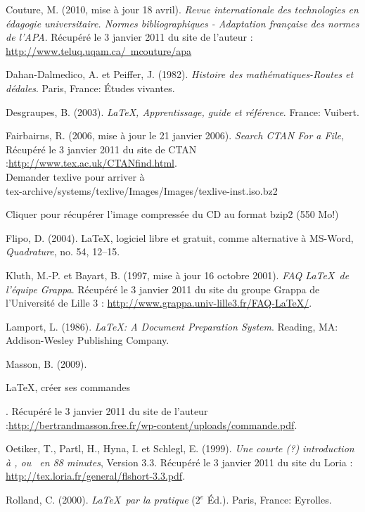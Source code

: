 \bigskip


\begin{thebibliography}{10}

 Couture, M. (2010, mise à jour 18 avril). {\em Revue internationale des technologies en édagogie universitaire. Normes bibliographiques - Adaptation française des normes de l'APA}. Récupéré le 3 janvier 2011 du site de l'auteur :  \href {http://www.teluq.uqam.ca/~mcouture/apa}{http://www.teluq.uqam.ca/~mcouture/apa}

 Dahan-Dalmedico, A.  et Peiffer, J. (1982). {\em Histoire des mathématiques-Routes et dédales}. Paris, France: Études vivantes.

 Desgraupes, B. (2003). {\em \LaTeX, Apprentissage, guide et référence}. France: Vuibert.

 Fairbairns, R. (2006, mise à jour le 21 janvier 2006). {\em Search CTAN For a File}, Récupéré le 3 janvier 2011 du site de CTAN :\href{http://www.tex.ac.uk/CTANfind.html}{http://www.tex.ac.uk/CTANfind.html}.\\
Demander texlive pour arriver à \\tex-archive/systems/texlive/Images/Images/texlive-inst.iso.bz2

Cliquer pour récupérer l'image compressée du CD au format bzip2 (550 Mo!)

 Flipo, D. (2004).  \LaTeX, logiciel libre et gratuit, comme alternative à MS-Word, {\em Quadrature}, no. 54, 12--15.

  Kluth, M.-P. et Bayart, B. (1997, mise à jour 16 octobre 2001). {\em FAQ  \LaTeX~de l'équipe Grappa}. Récupéré le 3 janvier 2011 du site du groupe Grappa de l'Université de Lille 3 : \href{http://www.grappa.univ-lille3.fr/FAQ-LaTeX/}{http://www.grappa.univ-lille3.fr/FAQ-LaTeX/}.

 Lamport, L. (1986). {\em \LaTeX: A Document Preparation System}. Reading, MA: Addison-Wesley Publishing Company.

 Masson, B. (2009). \begin{itshape}{\LaTeX, créer ses commandes}\end{itshape}. Récupéré le 3 janvier 2011 du site de l'auteur :\href {http://bertrandmasson.free.fr/wp-content/uploads/commande.pdf}{http://bertrandmasson.free.fr/wp-content/uploads/commande.pdf}.

 Oetiker, T., Partl, H., Hyna, I. et Schlegl, E. (1999). {\em Une courte (?) introduction à \LaTeXe, ou  \LaTeXe~en 88 minutes}, Version 3.3. Récupéré le 3 janvier 2011 du site du Loria : \href{http://tex.loria.fr/general/flshort-3.3.pdf}{http://tex.loria.fr/general/flshort-3.3.pdf}.

Rolland, C. (2000). {\em \LaTeX~par la pratique} ($2^e$ Éd.). Paris, France: Eyrolles.

\end{thebibliography}
